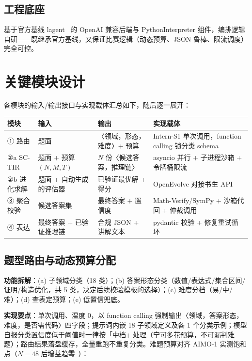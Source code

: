 \documentclass[11pt, a4paper]{ctexart}
\begin{document}
\subsection{工程底座}

基于官方基线 lagent~\cite{lagent} 的 OpenAI 兼容后端与 PythonInterpreter 组件，编排逻辑自研——既继承官方基线，又保证比赛逻辑（动态预算、JSON 鲁棒、限流调度）完全可控。

\section{关键模块设计}

各模块的输入/输出接口与实现载体汇总如下，随后逐一展开：

\begin{center}
\small
\begin{tabular}{lp{}p{}p{}}
\toprule
\textbf{模块} & \textbf{输入} & \textbf{输出} & \textbf{实现载体} \\
\midrule
① 路由 & 题面 & 〈领域，形态，难度〉+ 预算 & Intern-S1 单次调用，function calling 锁分类 schema \\
\addlinespace[0.2em]
②a SC-TIR & 题面 + 预算 $(N,M,T)$ & $N$ 份〈候选答案，推理链〉 & asyncio 并行 + 子进程沙箱 + 令牌桶限流 \\
\addlinespace[0.2em]
②b 进化求解 & 题面 + 自动生成的评估器 & 已验证最优解 + 得分 & OpenEvolve 对接书生 API \\
\addlinespace[0.2em]
③ 聚合校验 & 候选答案集 & 最终答案 + 置信度 & Math-Verify/SymPy + 沙箱代回 + 仲裁调用 \\
\addlinespace[0.2em]
④ 表达 & 最终答案 + 已验证推理链 & 合规 JSON + 讲解文本 & pydantic 校验 + 修复重试循环 \\
\bottomrule
\end{tabular}
\end{center}

\subsection{题型路由与动态预算分配}

\textbf{功能拆解}：(a) 子领域分类（18 类）；(b) 答案形态分类（数值/表达式/集合区间/证明/构造优化，共 5 类，决定后续校验模板的选择）；(c) 难度分档（易/中/难）；(d) 查表定预算；(e) 低置信兜底。

\textbf{实现要点}：单次调用、温度 0，以 function calling 强制输出〈领域，答案形态，难度，是否需代码〉四字段；提示词内嵌 18 子领域定义及各 1 个分类示例；模型自报分类置信度低于阈值时一律按「中档」处理（宁可多花预算，不可漏判难题）；路由结果落盘缓存，全量重跑不重复分类。难题预算对齐 AIMO-1 实测饱和点（$N{=}48$ 后增益趋零~\cite{aimo1}）：
\end{document}
